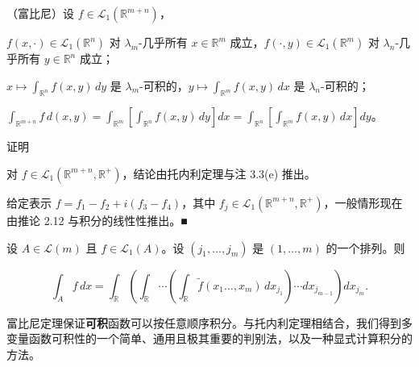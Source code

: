\begin{theorem}

（富比尼）设 $ f \in \mathcal{L}_{1}(\mathbb{R}^{m+n}) $，

\begin{subitems}
\item

$ f(x, \cdot) \in \mathcal{L}_{1}(\mathbb{R}^n) $ 对 $ \lambda_m $-几乎所有 $ x \in \mathbb{R}^m $ 成立，$ f(\cdot, y) \in \mathcal{L}_{1}(\mathbb{R}^m) $ 对 $ \lambda_n $-几乎所有 $ y \in \mathbb{R}^n $ 成立；

\item

$ x \mapsto \int_{\mathbb{R}^n} f(x, y) \, dy $ 是 $ \lambda_m $-可积的，$ y \mapsto \int_{\mathbb{R}^m} f(x, y) \, dx $ 是 $ \lambda_n $-可积的；

\item

$ \int_{\mathbb{R}^{m+n}} f \, d(x, y) = \int_{\mathbb{R}^m} \left[ \int_{\mathbb{R}^n} f(x, y) \, dy \right] dx = \int_{\mathbb{R}^n} \left[ \int_{\mathbb{R}^m} f(x, y) \, dx \right] dy $。

\end{subitems}

证明

\begin{items}
\item

对 $ f \in \mathcal{L}_{1}(\mathbb{R}^{m+n}, \mathbb{R}^{+}) $，结论由托内利定理与注 3.3(e) 推出。

\item

给定表示 $ f = f_1 - f_2 + i(f_3 - f_4) $，其中 $ f_j \in \mathcal{L}_{1}(\mathbb{R}^{m+n}, \mathbb{R}^{+}) $，一般情形现在由推论 2.12 与积分的线性性推出。\nobreak\hspace{0.35em}■

\end{items}

\end{theorem}

\begin{corollary}

设 $ A \in \mathcal{L}(m) $ 且 $ f \in \mathcal{L}_{1}(A) $。设 $ (j_1, \ldots, j_m) $ 是 $ (1, \ldots, m) $ 的一个排列。则

\[
\int_{A} f \, dx = \int_{\mathbb{R}} \left( \int_{\mathbb{R}} \cdots \left( \int_{\mathbb{R}} \tilde{f}(x_1 \ldots, x_m) \, dx_{j_1} \right) \cdots dx_{j_{m-1}} \right) dx_{j_m} .
\]

富比尼定理保证\textbf{可积}函数可以按任意顺序积分。与托内利定理相结合，我们得到多变量函数可积性的一个简单、通用且极其重要的判别法，以及一种显式计算积分的方法。

\end{corollary}

